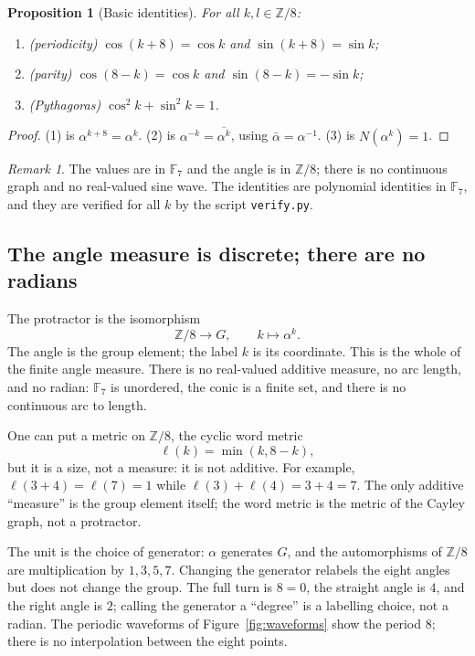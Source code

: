 \documentclass[11pt]{article}
\newtheorem{proposition}[theorem]{Proposition}
\theoremstyle{definition}
\theoremstyle{remark}
\newtheorem{remark}[theorem]{Remark}
\newcommand{\F}{\mathbb{F}}
\newcommand{\Z}{\mathbb{Z}}
\newcommand{\Norm}{N}
\begin{document}
\begin{proposition}[Basic identities]\label{prop:basic}
For all $k,l\in\Z/8$:
\begin{enumerate}
  \item (periodicity) $\cos(k+8)=\cos k$ and $\sin(k+8)=\sin k$;
  \item (parity) $\cos(8-k)=\cos k$ and $\sin(8-k)=-\sin k$;
  \item (Pythagoras) $\cos^2 k+\sin^2 k=1$.
\end{enumerate}
\end{proposition}

\begin{proof}
(1) is $\alpha^{k+8}=\alpha^k$.  (2) is $\alpha^{-k}=\overline{\alpha^k}$, using
$\bar\alpha=\alpha^{-1}$.  (3) is $\Norm(\alpha^k)=1$.
\end{proof}

\begin{remark}
The values are in $\F_7$ and the angle is in $\Z/8$; there is no continuous
graph and no real-valued sine wave.  The identities are polynomial identities
in $\F_7$, and they are verified for all $k$ by the script
\texttt{verify.py}.
\end{remark}

\subsection{The angle measure is discrete; there are no radians}
\label{subsec:no-radians}

The protractor is the isomorphism
\[
  \Z/8\longrightarrow G,\qquad k\longmapsto\alpha^k .
\]
The angle is the group element; the label $k$ is its coordinate.  This is the
whole of the finite angle measure.  There is no real-valued additive measure,
no arc length, and no radian: $\F_7$ is unordered, the conic is a finite set,
and there is no continuous arc to length.

One can put a metric on $\Z/8$, the cyclic word metric
\[
  \ell(k)=\min(k,8-k),
\]
but it is a size, not a measure: it is not additive.  For example,
$\ell(3+4)=\ell(7)=1$ while $\ell(3)+\ell(4)=3+4=7$.  The only additive
``measure'' is the group element itself; the word metric is the metric of the
Cayley graph, not a protractor.

The unit is the choice of generator: $\alpha$ generates $G$, and the
automorphisms of $\Z/8$ are multiplication by $1,3,5,7$.  Changing the
generator relabels the eight angles but does not change the group.  The full
turn is $8=0$, the straight angle is $4$, and the right angle is $2$; calling
the generator a ``degree'' is a labelling choice, not a radian.  The periodic
waveforms of Figure~\ref{fig:waveforms} show the period $8$; there is no
interpolation between the eight points.
\end{document}
